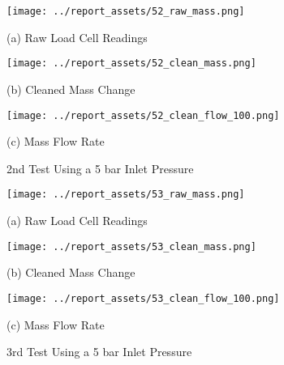 \begin{figure}[htbp]
    \centering

    \begin{minipage}{0.32\textwidth}
        \centering
        \texttt{[image: ../report\_assets/52\_raw\_mass.png]}
        \caption*{(a) Raw Load Cell Readings}
    \end{minipage}
    \hfill
    \begin{minipage}{0.32\textwidth}
        \centering
        \texttt{[image: ../report\_assets/52\_clean\_mass.png]}
        \caption*{(b) Cleaned Mass Change}
    \end{minipage}
    \hfill
    \begin{minipage}{0.32\textwidth}
        \centering
        \texttt{[image: ../report\_assets/52\_clean\_flow\_100.png]}
        \caption*{(c) Mass Flow Rate}
    \end{minipage}
    \caption{2nd Test Using a 5 bar Inlet Pressure}
    
\end{figure}\label{fig:52}
\vfill

\begin{figure}[htbp]
    \centering

    \begin{minipage}{0.32\textwidth}
        \centering
        \texttt{[image: ../report\_assets/53\_raw\_mass.png]}
        \caption*{(a) Raw Load Cell Readings}
    \end{minipage}
    \hfill
    \begin{minipage}{0.32\textwidth}
        \centering
        \texttt{[image: ../report\_assets/53\_clean\_mass.png]}
        \caption*{(b) Cleaned Mass Change}
    \end{minipage}
    \hfill
    \begin{minipage}{0.32\textwidth}
        \centering
        \texttt{[image: ../report\_assets/53\_clean\_flow\_100.png]}
        \caption*{(c) Mass Flow Rate}
    \end{minipage}
    \caption{3rd Test Using a 5 bar Inlet Pressure}
    
\end{figure}\label{fig:53}
\vfill
\newpage


